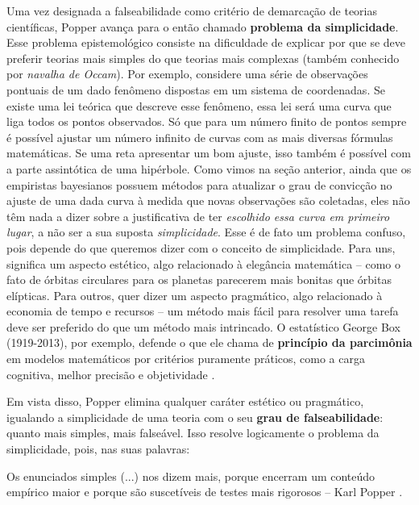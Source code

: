 \documentclass[./main.tex]{subfiles}
\begin{document}
\par Uma vez designada a falseabilidade como critério de demarcação de teorias científicas, Popper avança para o então chamado \textbf{problema da simplicidade}. Esse problema epistemológico consiste na dificuldade de explicar por que se deve preferir teorias mais simples do que teorias mais complexas (também conhecido por \textit{navalha de Occam}). Por exemplo, considere uma série de observações pontuais de um dado fenômeno dispostas em um sistema de coordenadas. Se existe uma lei teórica que descreve esse fenômeno, essa lei será uma curva que liga todos os pontos observados. Só que para um número finito de pontos sempre é possível ajustar um número infinito de curvas com as mais diversas fórmulas matemáticas. Se uma reta apresentar um bom ajuste, isso também é possível com a parte assintótica de uma hipérbole. Como vimos na seção anterior, ainda que os empiristas bayesianos possuem métodos para atualizar o grau de convicção no ajuste de uma dada curva à medida que novas observações são coletadas, eles não têm nada a dizer sobre a justificativa de ter \textit{escolhido essa curva em primeiro lugar}, a não ser a sua suposta \textit{simplicidade}. Esse é de fato um problema confuso, pois depende do que queremos dizer com o conceito de simplicidade. Para uns, significa um aspecto estético, algo relacionado à elegância matemática – como o fato de órbitas circulares para os planetas parecerem mais bonitas que órbitas elípticas. Para outros, quer dizer um aspecto pragmático, algo relacionado à economia de tempo e recursos – um método mais fácil para resolver uma tarefa deve ser preferido do que um método mais intrincado. O estatístico George Box (1919-2013), por exemplo, defende o que ele chama de \textbf{princípio da parcimônia} em modelos matemáticos por critérios puramente práticos, como a carga cognitiva, melhor precisão e objetividade \cite{Box1979}.

\par Em vista disso, Popper elimina qualquer caráter estético ou pragmático, igualando a simplicidade de uma teoria com o seu \textbf{grau de falseabilidade}: quanto mais simples, mais falseável. Isso resolve logicamente o problema da simplicidade, pois, nas suas palavras:

\begin{adjustwidth}{100pt}{0pt}
\medskip
\small Os enunciados simples (...) nos dizem mais, porque encerram um conteúdo empírico maior e porque são suscetíveis de testes mais rigorosos -- Karl Popper \cite{popper2004logica}.
\medskip
\end{adjustwidth}
\end{document}
